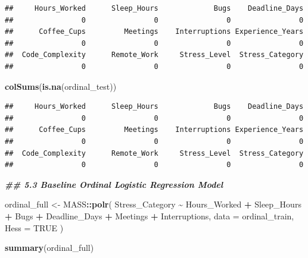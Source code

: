 \documentclass[
]{article}
\newenvironment{Shaded}{\begin{snugshade}}{\end{snugshade}}
\newcommand{\AttributeTok}[1]{\textcolor[rgb]{0.13,0.29,0.53}{#1}}
\newcommand{\ConstantTok}[1]{\textcolor[rgb]{0.56,0.35,0.01}{#1}}
\newcommand{\DocumentationTok}[1]{\textcolor[rgb]{0.56,0.35,0.01}{\textbf{\textit{#1}}}}
\newcommand{\FunctionTok}[1]{\textcolor[rgb]{0.13,0.29,0.53}{\textbf{#1}}}
\newcommand{\NormalTok}[1]{#1}
\newcommand{\OtherTok}[1]{\textcolor[rgb]{0.56,0.35,0.01}{#1}}
\newcommand{\SpecialCharTok}[1]{\textcolor[rgb]{0.81,0.36,0.00}{\textbf{#1}}}
\begin{document}
\begin{verbatim}
##     Hours_Worked      Sleep_Hours             Bugs    Deadline_Days 
##                0                0                0                0 
##      Coffee_Cups         Meetings    Interruptions Experience_Years 
##                0                0                0                0 
##  Code_Complexity      Remote_Work     Stress_Level  Stress_Category 
##                0                0                0                0
\end{verbatim}

\begin{Shaded}
\begin{Highlighting}[]
\FunctionTok{colSums}\NormalTok{(}\FunctionTok{is.na}\NormalTok{(ordinal\_test))}
\end{Highlighting}
\end{Shaded}

\begin{verbatim}
##     Hours_Worked      Sleep_Hours             Bugs    Deadline_Days 
##                0                0                0                0 
##      Coffee_Cups         Meetings    Interruptions Experience_Years 
##                0                0                0                0 
##  Code_Complexity      Remote_Work     Stress_Level  Stress_Category 
##                0                0                0                0
\end{verbatim}

\begin{Shaded}
\begin{Highlighting}[]
\DocumentationTok{\#\# 5.3 Baseline Ordinal Logistic Regression Model}

\NormalTok{ordinal\_full }\OtherTok{\textless{}{-}}\NormalTok{ MASS}\SpecialCharTok{::}\FunctionTok{polr}\NormalTok{(}
\NormalTok{  Stress\_Category }\SpecialCharTok{\textasciitilde{}}
\NormalTok{    Hours\_Worked }\SpecialCharTok{+}
\NormalTok{    Sleep\_Hours }\SpecialCharTok{+}
\NormalTok{    Bugs }\SpecialCharTok{+}
\NormalTok{    Deadline\_Days }\SpecialCharTok{+}
\NormalTok{    Meetings }\SpecialCharTok{+}
\NormalTok{    Interruptions,}
  \AttributeTok{data =}\NormalTok{ ordinal\_train,}
  \AttributeTok{Hess =} \ConstantTok{TRUE}
\NormalTok{)}

\FunctionTok{summary}\NormalTok{(ordinal\_full)}
\end{Highlighting}
\end{Shaded}
\end{document}
